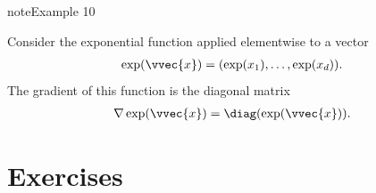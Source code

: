 \documentclass[letterpaper,10pt,english]{jupyterBook}
\begin{document}
\label{optimization_gradients:example-3}
\begin{sphinxadmonition}{note}{Example 10}



\sphinxAtStartPar
Consider the exponential function applied element\sphinxhyphen{}wise to a vector
\begin{equation*}
\begin{split}\exp(\vvec{x}) = (\exp(x_1),\ldots,\exp(x_d)).\end{split}
\end{equation*}
The gradient of this function is the diagonal matrix
\begin{equation*}
\begin{split}\nabla \exp(\vvec{x}) = \diag(\exp(\vvec{x})).\end{split}
\end{equation*}
\end{sphinxadmonition}

\sphinxstepscope


\section{Exercises}
\label{\detokenize{optimization_exercises:exercises}}\label{\detokenize{optimization_exercises::doc}}
\end{document}
